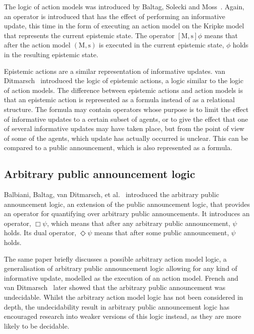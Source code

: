 The logic of action models was introduced by Baltag, Solecki and
Moss~\cite{baltag2004logics}. Again, an operator is introduced that has the
effect of performing an informative update, this time in the form of executing
an action model on the Kripke model that represents the current epistemic
state.  The operator $[\mathrm{M,s}]\phi$ means that after the action model
$(\mathrm{M, s})$ is executed in the current epistemic state, $\phi$ holds in
the resulting epistemic state. 

Epistemic actions are a similar representation of informative updates.
van
Ditmarsch~\cite{vanditmarsch1999logic,vanditmarsch2001knowledge,vanditmarsch2007dynamic}
introduced the logic of epistemic actions, a logic similar to the logic of
action models. The difference between epistemic actions and action models is
that an epistemic action is represented as a formula instead of as a relational
structure. The formula may contain operators whose purpose is to limit the
effect of informative updates to a certain subset of agents, or to give the
effect that one of several informative updates may have taken place, but from
the point of view of some of the agents, which update has actually occurred is
unclear. This can be compared to a public announcement, which is also
represented as a formula.

\subsection{Arbitrary public announcement logic}

Balbiani, Baltag, van Ditmarsch, et al.~\cite{balbiani2007arbitrary} introduced
the arbitrary public announcement logic, an extension of the public announcement
logic, that provides an operator for quantifying over arbitrary public
announcements. It introduces an operator, $\Box\psi$, which means that after
any arbitrary public announcement, $\psi$ holds. Its dual operator,
$\Diamond\psi$ means that after some public announcement, $\psi$ holds.

The same paper briefly discusses a possible arbitrary action model logic, a
generalisation of arbitrary public announcement logic allowing for any kind of
informative update, modelled as the execution of an action model. French and
van Ditmarsch~\cite{french2008undecidability} later showed that the arbitrary
public announcement was undecidable. Whilst the arbitrary action model logic has
not been considered in depth, the undecidability result in arbitrary public
announcement logic has encouraged research into weaker versions of this logic
instead, as they are more likely to be decidable.

